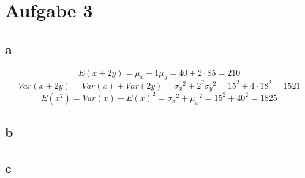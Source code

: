 

\section{Aufgabe 3}

\subsection{a}
\[ E(x+2y) = \mu_x + 1 \mu_y = 40+2 \cdot 85 = 210 \]
\[ Var(x+2y) = Var(x) + Var(2y) = {\sigma_x}^2 + 2^2 {\sigma_y}^2 
= 15^2 + 4 \cdot 18^2 = 1521 \]
\[ E(x^2) = Var(x) + E(x)^2 = {\sigma_x}^2 + {\mu_x}^2 = 15^2 + 40^2 = 1825 \]

\subsection{b}


\subsection{c}

